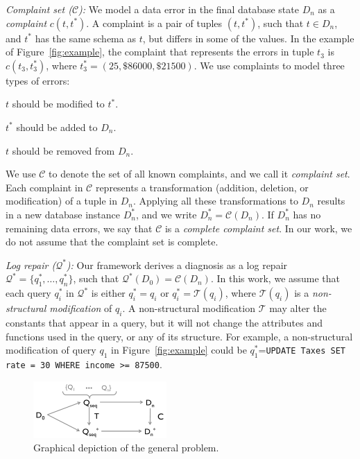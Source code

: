 \noindent
\emph{Complaint set ($\mathcal{C}$):}
We model a data error in the final database state $D_n$ as a \emph{complaint}
$c(t,t^*)$. A complaint is a pair of tuples $(t,t^*)$, such that $t\in D_n$,
and $t^*$ has the same schema as $t$, but differs in some of the values. In
the example of Figure~\ref{fig:example}, the complaint that represents the
errors in tuple $t_3$ is $c(t_3,t_3^*)$, where $t_3^*=(25,\$86000,\$21500)$.  We use complaints to model three types of errors:
\begin{description}[itemsep=0pt, parsep=0pt]
    \item[Incorrect values $c(t,t^*)$:] $t$ should be modified to $t^*$.
    \item[Missing tuples $c(\_,t^*)$:] $t^*$ should be added to $D_n$.
    \item[Present tuples $c(t,\_)$:] $t$ should be removed from $D_n$.
\end{description}
% 
We use $\mathcal{C}$ to denote the set of all known complaints, and we call it
\emph{complaint set}. Each complaint in $\mathcal{C}$ represents a
transformation (addition, deletion, or modification) of a tuple in $D_n$.
Applying all these transformations to $D_n$ results in a new database instance
$D_n^*$, and we write $D_n^*=\mathcal{C}(D_n)$. If $D_n^*$ has no remaining
data errors, we say that $\mathcal{C}$ is a \emph{complete complaint set}. 
In our work, we do not assume that the complaint set is complete.

\smallskip
\noindent
\emph{Log repair ($\mathcal{Q}^*$):}
Our framework derives a diagnosis as a log repair
$\mathcal{Q}^*=\{q_1^*,\dots, q_n^*\}$, such that
$\mathcal{Q}^*(D_0)=\mathcal{C}(D_n)$. In this work, we assume that each query
$q_i^*$ in $\mathcal{Q}^*$ is either $q_i^*=q_i$ or $q_i^*=\mathcal{T}(q_i)$,
where $\mathcal{T}(q_i)$ is a \emph{non-structural modification} of $q_i$. A
non-structural modification $\mathcal{T}$ may alter the constants that appear
in a query, but it will not change the attributes and functions used in the
query, or any of its structure. For example, a non-structural modification of
query $q_1$ in Figure~\ref{fig:example} could be $q_1^*$=\texttt{UPDATE Taxes
SET rate = 30 WHERE income >= 87500}.

\xxx{===}





\begin{figure}[t]
\centering
\includegraphics[width = 2in]{figures/probtransform}
\caption{Graphical depiction of the general \sys problem.}
\label{f:probtransform} 
\end{figure}



